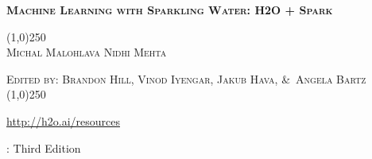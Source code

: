 


%
%
\usepackage{tabularx}
\usepackage{booktabs}
\usepackage{forest}
\usepackage{url}
\usepackage{longtable}
\def\UrlBreaks{\do\/\do-\do_\do.}



\thispagestyle{empty} %

\begin{center}
\textsc{\large\bf{Machine Learning with Sparkling Water: H2O + Spark}}

\bigskip
\line(1,0){250}  %
\\
\bigskip
\textsc{\small{Michal Malohlava\hspace{20pt} Nidhi Mehta}}

\textsc{\small{Edited by: Brandon Hill, Vinod Iyengar, Jakub Hava, \&\ Angela Bartz}}
\\
\bigskip
\line(1,0){250}  %


{\url{http://h2o.ai/resources}}

\bigskip
\monthname \hspace{1pt}  \the\year: Third Edition 
\\%
\bigskip
\end{center}

\newpage
\null\vfill %

\thispagestyle{empty}%


